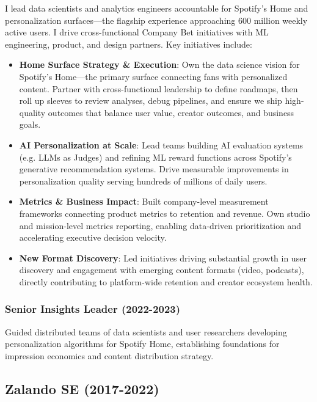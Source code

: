\documentclass[a4paper]{article}
\begin{document}
I lead data scientists and analytics engineers accountable for Spotify's Home and personalization surfaces---the flagship experience approaching 600 million weekly active users. I drive cross-functional Company Bet initiatives with ML engineering, product, and design partners. Key initiatives include: \\

\begin{itemize}
    \item \textbf{Home Surface Strategy \& Execution}: Own the data science vision for Spotify's Home---the primary surface connecting fans with personalized content. Partner with cross-functional leadership to define roadmaps, then roll up sleeves to review analyses, debug pipelines, and ensure we ship high-quality outcomes that balance user value, creator outcomes, and business goals.
    \item \textbf{AI Personalization at Scale}: Lead teams building AI evaluation systems (e.g. LLMs as Judges) and refining ML reward functions across Spotify's generative recommendation systems. Drive measurable improvements in personalization quality serving hundreds of millions of daily users.
    \item \textbf{Metrics \& Business Impact}: Built company-level measurement frameworks connecting product metrics to retention and revenue. Own studio and mission-level metrics reporting, enabling data-driven prioritization and accelerating executive decision velocity.
    \item \textbf{New Format Discovery}: Led initiatives driving substantial growth in user discovery and engagement with emerging content formats (video, podcasts), directly contributing to platform-wide retention and creator ecosystem health.
\end{itemize}

\subsubsection*{Senior Insights Leader (2022-2023)}

Guided distributed teams of data scientists and user researchers developing personalization algorithms for Spotify Home, establishing foundations for impression economics and content distribution strategy.

\subsection*{Zalando SE (2017-2022)}
\end{document}
